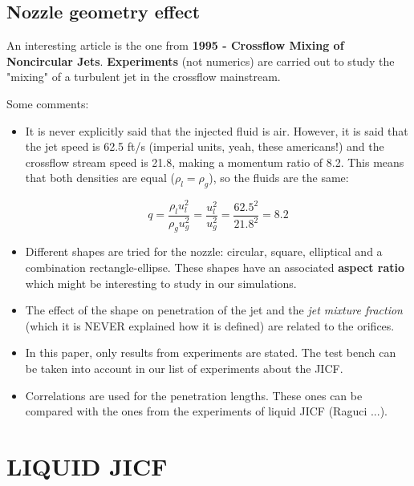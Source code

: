 \subsection{Nozzle geometry effect}

An interesting article is the one from \textbf{1995 - Crossflow Mixing of Noncircular Jets}. \textbf{Experiments} (not numerics) are carried out to study the "mixing" of a turbulent jet in the crossflow mainstream.

Some comments:

\begin{itemize}

\item It is never explicitly said that the injected fluid is air. However, it is said that the jet speed is 62.5 ft/s (imperial units, yeah, these americans!) and the crossflow stream speed is 21.8, making a momentum ratio of 8.2. This means that both densities are equal ($\rho_l = \rho_g$), so the fluids are the same:

\begin{equation}
q = \frac{\rho_l u_l^2}{\rho_g u_g^2} = \frac{u_l^2}{u_g^2} = \frac{62.5^2}{21.8^2} = 8.2
\end{equation}

\item Different shapes are tried for the nozzle: circular, square, elliptical and a combination rectangle-ellipse. These shapes have an associated \textbf{aspect ratio} which might be interesting to study in our simulations.

\item The effect of the shape on penetration of the jet and the \textsl{jet mixture fraction} (which it is NEVER explained how it is defined) are related to the orifices.

\item In this paper, only results from experiments are stated. The test bench can be taken into account in our list of experiments about the JICF. 

\item Correlations are used for the penetration lengths. These ones can be compared with the ones from the experiments of liquid JICF (Raguci ...).

\end{itemize}


\section{LIQUID JICF}

